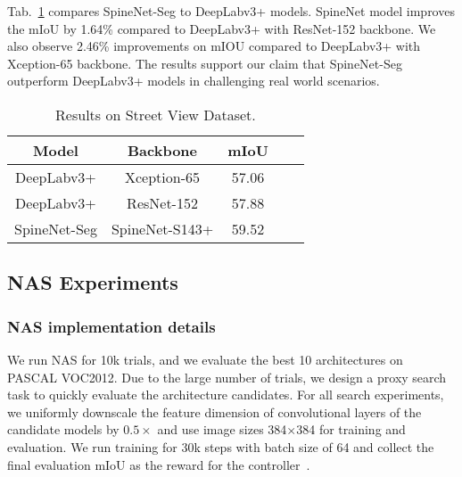 \documentclass[10pt,twocolumn,letterpaper]{article}
\begin{document}
Tab.~\ref{tab:results_sv} compares SpineNet-Seg to DeepLabv3+ models. SpineNet model improves the mIoU by 1.64\% compared to DeepLabv3+ with ResNet-152 backbone. We also observe 2.46\% improvements on mIOU compared to DeepLabv3+ with Xception-65 backbone. The results support our claim that SpineNet-Seg outperform DeepLabv3+ models in challenging real world scenarios.

\setlength{\tabcolsep}{4pt}
\begin{table}[h!]
\centering
\begin{tabular}{c| c | c  c | c}
  \toprule
  Model & Backbone & mIoU  \\
  \midrule
  DeepLabv3+ & Xception-65 & 57.06 \\
  DeepLabv3+ & ResNet-152 & 57.88 \\
  SpineNet-Seg & SpineNet-S143+ & 59.52 \\
  \bottomrule
\end{tabular}
\caption{Results on Street View Dataset.}
\label{tab:results_sv} 
\end{table}


\subsection{NAS Experiments}
\subsubsection{NAS implementation details}
We run NAS for 10k trials, and we evaluate the best 10 architectures on PASCAL VOC2012. Due to the large number of trials, we design a proxy search task to quickly evaluate the architecture candidates. For all search experiments, we uniformly downscale the feature dimension of convolutional layers of the candidate models by $0.5\times$ and use image sizes 384$\times$384 for training and evaluation. We run training for 30k steps with batch size of 64 and collect the final evaluation mIoU as the reward for the controller~\cite{nas}.
\end{document}
